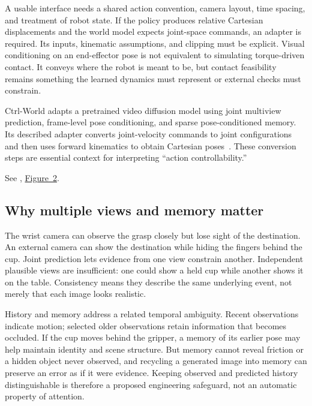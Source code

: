 A usable interface needs a shared action convention, camera layout, time spacing, and treatment of robot state. If the policy produces relative Cartesian displacements and the world model expects joint-space commands, an adapter is required. Its inputs, kinematic assumptions, and clipping must be explicit. Visual conditioning on an end-effector pose is not equivalent to simulating torque-driven contact. It conveys where the robot is meant to be, but contact feasibility remains something the learned dynamics must represent or external checks must constrain.

Ctrl-World adapts a pretrained video diffusion model using joint multiview prediction, frame-level pose conditioning, and sparse pose-conditioned memory. Its described adapter converts joint-velocity commands to joint configurations and then uses forward kinematics to obtain Cartesian poses~\citep{ctrl}. These conversion steps are essential context for interpreting ``action controllability.''

\noindent See \citet{ctrl}, \href{https://arxiv.org/pdf/2510.10125v3}{Figure~2}.


\subsection{Why multiple views and memory matter}
The wrist camera can observe the grasp closely but lose sight of the destination. An external camera can show the destination while hiding the fingers behind the cup. Joint prediction lets evidence from one view constrain another. Independent plausible views are insufficient: one could show a held cup while another shows it on the table. Consistency means they describe the same underlying event, not merely that each image looks realistic.

History and memory address a related temporal ambiguity. Recent observations indicate motion; selected older observations retain information that becomes occluded. If the cup moves behind the gripper, a memory of its earlier pose may help maintain identity and scene structure. But memory cannot reveal friction or a hidden object never observed, and recycling a generated image into memory can preserve an error as if it were evidence. Keeping observed and predicted history distinguishable is therefore a proposed engineering safeguard, not an automatic property of attention.

